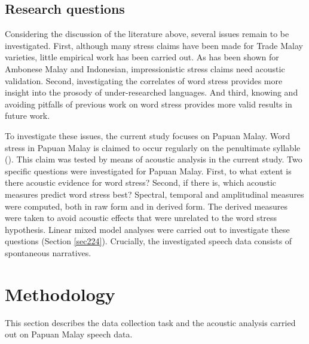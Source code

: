 \subsection{Research questions} \label{sec215}
Considering the discussion of the literature above, several issues remain to be investigated. First, although many stress claims have been made for Trade Malay varieties, little empirical work has been carried out. As has been shown for Ambonese Malay and Indonesian, impressionistic stress claims need acoustic validation. Second, investigating the correlates of word stress provides more insight into the prosody of under-researched languages. And third, knowing and avoiding pitfalls of previous work on word stress provides more valid results in future work.\par

To investigate these issues, the current study focuses on Papuan Malay. Word stress in Papuan Malay is claimed to occur regularly on the penultimate syllable (\citealt{kluge_grammar_2017}). This claim was tested by means of acoustic analysis in the current study. Two specific questions were investigated for Papuan Malay. First, to what extent is there acoustic evidence for word stress? Second, if there is, which acoustic measures predict word stress best? Spectral, temporal and amplitudinal measures were computed, both in raw form and in derived form. The derived measures were taken to avoid acoustic effects that were unrelated to the word stress hypothesis. Linear mixed model analyses were carried out to investigate these questions (Section \ref{sec224}). Crucially, the investigated speech data consists of spontaneous narratives.

\section{Methodology}
This section describes the data collection task and the acoustic analysis carried out on Papuan Malay speech data. 


